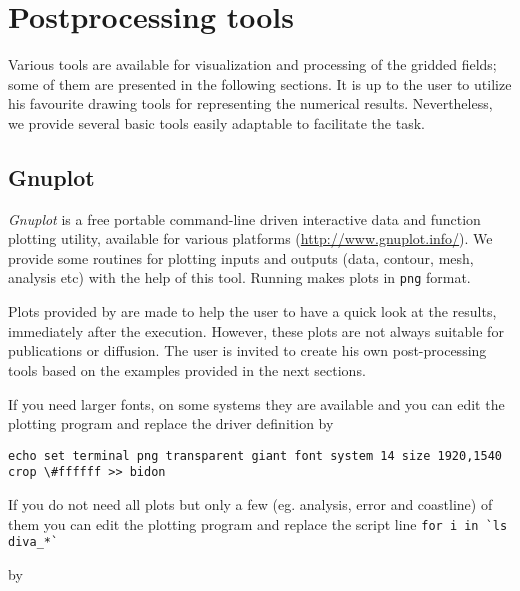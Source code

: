 \chapter{Postprocessing tools\label{chap:postprocessing}}

Various tools are available for visualization and processing of the gridded fields; some of them are presented in the following sections. It is up to the user to utilize his favourite drawing tools for representing the numerical results. Nevertheless, we provide several basic tools easily adaptable to facilitate the task.


\minitoc

\section{Gnuplot\label{sec:visugnuplot}}

\textsl{Gnuplot} is a free portable command-line driven interactive data and function plotting utility, available for various platforms (\url{http://www.gnuplot.info/}). We provide some routines for plotting \diva inputs and outputs (data, contour, mesh, analysis etc) with the help of this tool. Running  makes plots in \texttt{png} format. 

\begin{tips}
Plots provided by \gnuplot are made to help the user to have a quick look at the results, immediately after the execution. However, these plots are not always suitable for publications or diffusion. The user is invited to create his own post-processing tools based on the examples provided in the next sections.\end{tips}

\begin{tips}
If you need larger fonts, on some systems they are available and you can edit the plotting program 
and replace the driver definition by
\begin{tiny}
\begin{verbatim}
echo set terminal png transparent giant font system 14 size 1920,1540 crop \#ffffff >> bidon
\end{verbatim}
\end{tiny}
\end{tips}

\begin{tips}
If you do not need all plots but only a few (eg. analysis, error and coastline) of them you can edit the plotting program  and replace the script line \verb#for i in `ls diva_*`# 

by
\end{tips}

